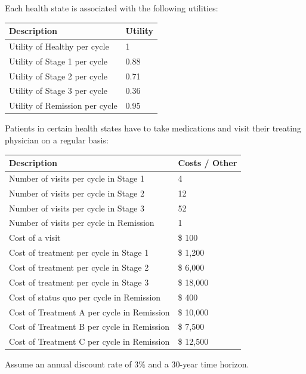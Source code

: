 \documentclass[
  letterpaper,
  DIV=11,
  numbers=noendperiod,
  oneside]{scrartcl}
\begin{document}
Each health state is associated with the following utilities:

\begin{longtable}[]{@{}ll@{}}
\toprule()
Description & Utility \\
\midrule()
\endhead
Utility of Healthy per cycle & 1 \\
Utility of Stage 1 per cycle & 0.88 \\
Utility of Stage 2 per cycle & 0.71 \\
Utility of Stage 3 per cycle & 0.36 \\
Utility of Remission per cycle & 0.95 \\
\bottomrule()
\end{longtable}

Patients in certain health states have to take medications and visit
their treating physician on a regular basis:

\begin{longtable}[]{@{}ll@{}}
\toprule()
Description & Costs / Other \\
\midrule()
\endhead
Number of visits per cycle in Stage 1 & 4 \\
Number of visits per cycle in Stage 2 & 12 \\
Number of visits per cycle in Stage 3 & 52 \\
Number of visits per cycle in Remission & 1 \\
Cost of a visit & \$ 100 \\
Cost of treatment per cycle in Stage 1 & \$ 1,200 \\
Cost of treatment per cycle in Stage 2 & \$ 6,000 \\
Cost of treatment per cycle in Stage 3 & \$ 18,000 \\
Cost of status quo per cycle in Remission & \$ 400 \\
Cost of Treatment A per cycle in Remission & \$ 10,000 \\
Cost of Treatment B per cycle in Remission & \$ 7,500 \\
Cost of Treatment C per cycle in Remission & \$ 12,500 \\
\bottomrule()
\end{longtable}

Assume an annual discount rate of 3\% and a 30-year time horizon.
\end{document}
